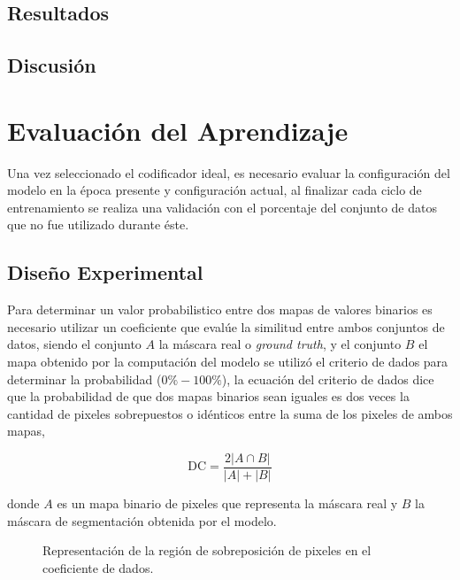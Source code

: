 \subsection{Resultados}
\subsection{Discusión}

\section{Evaluación del Aprendizaje}
Una vez seleccionado el codificador ideal, es necesario evaluar la configuración del modelo en la época presente y configuración actual, al finalizar cada ciclo de entrenamiento se realiza una validación con el porcentaje del conjunto de datos que no fue utilizado durante éste.
\subsection{Diseño Experimental}
Para determinar un valor probabilistico entre dos mapas de valores binarios es necesario utilizar un coeficiente que evalúe la similitud entre ambos conjuntos de datos, siendo el conjunto $A$ la máscara real o \emph{ground truth}, y el conjunto $B$ el mapa obtenido por la computación del modelo se utilizó el criterio de dados para determinar la probabilidad ($0 \% - 100 \%$), la ecuación del criterio de dados dice que la probabilidad de que dos mapas binarios sean iguales es dos veces la cantidad de pixeles sobrepuestos o idénticos entre la suma de los pixeles de ambos mapas, 

\begin{equation}\label{eq:diceloss}
    \text{DC} = \frac{2|A \cap B |}{|A| + |B|}
\end{equation}

donde $A$ es un mapa binario de pixeles que representa la máscara real y $B$ la máscara de segmentación obtenida por el modelo.

\def\firstcircle{(0,0) circle (1.5cm)}
\def\secondcircle{(2,0) circle (1.5cm)}
\def\thirdcircle{(0:2cm) circle (1.5cm)}

\begin{figure}[h]
    \centering
    \caption{Representación de la región de sobreposición de pixeles en el coeficiente de dados.}
\end{figure}

